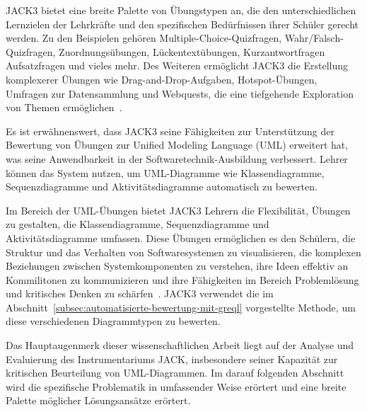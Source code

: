 JACK3 bietet eine breite Palette von Übungstypen an, die den unterschiedlichen Lernzielen der Lehrkräfte und den
spezifischen Bedürfnissen ihrer Schüler gerecht werden. Zu den Beispielen gehören Multiple-Choice-Quizfragen,
Wahr/Falsch-Quizfragen, Zuordnungsübungen, Lückentextübungen, Kurzantwortfragen Aufsatzfragen und vieles mehr. Des
Weiteren ermöglicht JACK3 die Erstellung komplexerer Übungen wie Drag-and-Drop-Aufgaben, Hotspot-Übungen, Umfragen zur
Datensammlung und Webquests, die eine tiefgehende Exploration von Themen ermöglichen~\cite{jack}.

Es ist erwähnenswert, dass JACK3 seine Fähigkeiten zur Unterstützung der Bewertung von Übungen zur Unified Modeling
Language (UML) erweitert hat, was seine Anwendbarkeit in der Softwaretechnik-Ausbildung verbessert. Lehrer können das
System nutzen, um UML-Diagramme wie Klassendiagramme, Sequenzdiagramme und Aktivitätsdiagramme automatisch zu bewerten.

Im Bereich der UML-Übungen bietet JACK3 Lehrern die Flexibilität, Übungen zu gestalten, die Klassendiagramme,
Sequenzdiagramme und Aktivitätsdiagramme umfassen. Diese Übungen ermöglichen es den Schülern, die Struktur und das
Verhalten von Softwaresystemen zu visualisieren, die komplexen Beziehungen zwischen Systemkomponenten zu verstehen,
ihre Ideen effektiv an Kommilitonen zu kommunizieren und ihre Fähigkeiten im Bereich Problemlösung und kritisches
Denken zu schärfen~\cite{jack}. JACK3 verwendet die im Abschnitt~\ref{subsec:automatisierte-bewertung-mit-greql}
vorgestellte Methode, um diese verschiedenen Diagrammtypen zu bewerten.


Das Hauptaugenmerk dieser wissenschaftlichen Arbeit liegt auf der Analyse und Evaluierung des Instrumentariums JACK,
insbesondere seiner Kapazität zur kritischen Beurteilung von UML-Diagrammen. Im darauf folgenden Abschnitt wird die
spezifische Problematik in umfassender Weise erörtert und eine breite Palette möglicher Lösungsansätze erörtert.